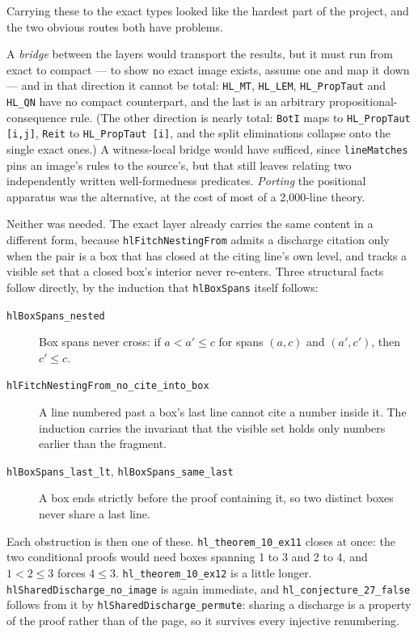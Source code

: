\documentclass[11pt]{article}
\theoremstyle{plain}
\newcommand{\ubrk}{\_\discretionary{}{}{}}
\newcommand{\isa}[1]{\textup{\texttt{\small #1}}}
\begin{document}
Carrying these to the exact types looked like the hardest part of the project,
and the two obvious routes both have problems.

A \emph{bridge} between the layers would transport the results, but it must run
from exact to compact --- to show no exact image exists, assume one and map it
down --- and in that direction it cannot be total: \isa{HL\ubrk{}MT},
\isa{HL\ubrk{}LEM}, \isa{HL\ubrk{}PropTaut} and \isa{HL\ubrk{}QN} have no compact counterpart,
and the last is an arbitrary propositional-consequence rule. (The other
direction is nearly total: \isa{BotI} maps to \isa{HL\ubrk{}PropTaut [i,j]},
\isa{Reit} to \isa{HL\ubrk{}PropTaut [i]}, and the split eliminations collapse onto
the single exact ones.) A witness-local bridge would have sufficed, since
\isa{lineMatches} pins an image's rules to the source's, but that still leaves
relating two independently written well-formedness predicates. \emph{Porting}
the positional apparatus was the alternative, at the cost of most of a
2{,}000-line theory.

Neither was needed. The exact layer already carries the same content in a
different form, because \isa{hlFitchNestingFrom} admits a discharge citation
only when the pair is a box that has closed at the citing line's own level, and
tracks a visible set that a closed box's interior never re-enters. Three
structural facts follow directly, by the induction that
\isa{hlBoxSpans} itself follows:

\begin{description}
\item[\isa{hlBoxSpans\ubrk{}nested}] Box spans never cross: if $a < a' \le c$ for
  spans $(a,c)$ and $(a',c')$, then $c' \le c$.
\item[\isa{hlFitchNestingFrom\ubrk{}no\ubrk{}cite\ubrk{}into\ubrk{}box}] A line numbered past a
  box's last line cannot cite a number inside it. The induction carries the
  invariant that the visible set holds only numbers earlier than the fragment.
\item[\isa{hlBoxSpans\ubrk{}last\ubrk{}lt}, \isa{hlBoxSpans\ubrk{}same\ubrk{}last}] A box ends
  strictly before the proof containing it, so two distinct boxes never share a
  last line.
\end{description}

\noindent
Each obstruction is then one of these. \isa{hl\ubrk{}theorem\ubrk{}10\ubrk{}ex11} closes at once:
the two conditional proofs would need boxes spanning 1 to 3 and 2 to 4, and
$1 < 2 \le 3$ forces $4 \le 3$. \isa{hl\ubrk{}theorem\ubrk{}10\ubrk{}ex12} is a little longer.
\isa{hlSharedDischarge\ubrk{}no\ubrk{}image} is again immediate, and
\isa{hl\ubrk{}conjecture\ubrk{}27\ubrk{}false} follows from it by
\isa{hlSharedDischarge\ubrk{}permute}: sharing a discharge is a property of the
proof rather than of the page, so it survives every injective renumbering.
\end{document}
